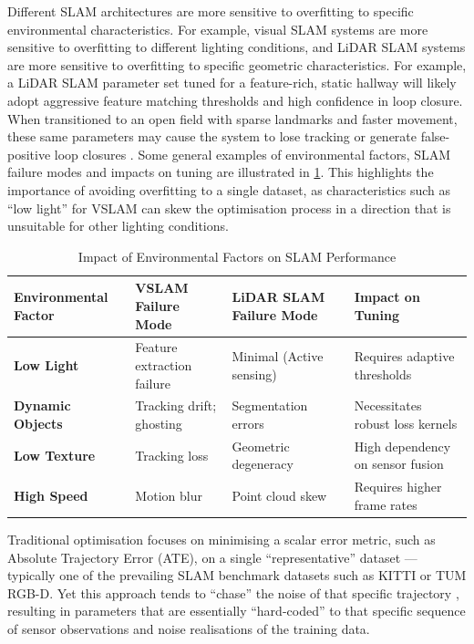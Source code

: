 Different SLAM architectures are more sensitive to overfitting to specific environmental characteristics. For example, visual SLAM systems are more sensitive to overfitting to different lighting conditions, and LiDAR SLAM systems are more sensitive to overfitting to specific geometric characteristics. For example, a LiDAR SLAM parameter set tuned for a feature-rich, static hallway will likely adopt aggressive feature matching thresholds and high confidence in loop closure. When transitioned to an open field with sparse landmarks and faster movement, these same parameters may cause the system to lose tracking or generate false-positive loop closures \cite{soumyadipIntroductionLiDARSLAM2024}. Some general examples of environmental factors, SLAM failure modes and impacts on tuning are illustrated in \cref{tab:slam_failure_modes}. This highlights the importance of avoiding overfitting to a single dataset, as characteristics such as ``low light'' for VSLAM can skew the optimisation process in a direction that is unsuitable for other lighting conditions. 

\begin{table}[h]
\centering
\small
\renewcommand{\arraystretch}{1.5}
\begin{tabularx}{\textwidth}{@{} >{\bfseries}l X X X @{}}
\toprule
Environmental Factor & \textbf{VSLAM Failure Mode} & \textbf{LiDAR SLAM Failure Mode} & \textbf{Impact on Tuning} \\ 
\midrule
Low Light & Feature extraction failure \cite{schmidtROVERMultiSeasonDataset2024} & Minimal (Active sensing) & Requires adaptive thresholds \cite{schmidtROVERMultiSeasonDataset2024} \\ 
\addlinespace
Dynamic Objects & Tracking drift; ghosting \cite{soaresVARSLAMVisualAdaptive2025} & Segmentation errors \cite{soumyadipIntroductionLiDARSLAM2024} & Necessitates robust loss kernels \cite{soaresVARSLAMVisualAdaptive2025} \\ 
\addlinespace
Low Texture & Tracking loss \cite{linguaImprovingImageAlignment2025} & Geometric degeneracy \cite{soumyadipIntroductionLiDARSLAM2024} & High dependency on sensor fusion \cite{weiLiDARVisualInertial2026} \\ 
\addlinespace
High Speed & Motion blur \cite{xuTKOSLAMVisualSLAM2024} & Point cloud skew \cite{soumyadipIntroductionLiDARSLAM2024} & Requires higher frame rates \cite{xuTKOSLAMVisualSLAM2024} \\ 
\bottomrule
\end{tabularx}
\caption{Impact of Environmental Factors on SLAM Performance}
\label{tab:slam_failure_modes}
\end{table}

Traditional optimisation focuses on minimising a scalar error metric, such as Absolute Trajectory Error (ATE), on a single ``representative'' dataset --- typically one of the prevailing SLAM benchmark datasets such as KITTI or TUM RGB-D. Yet this approach tends to ``chase'' the noise of that specific trajectory \cite{kandasamyTuningHyperparametersGrad}, resulting in parameters that are essentially ``hard-coded'' to that specific sequence of sensor observations and noise realisations of the training data. 
